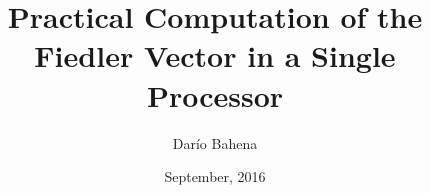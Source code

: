 \documentclass[unknownkeysallowed]{beamer}
\title{Practical Computation of the Fiedler Vector in a Single Processor}
\author{Darío Bahena}
\institute{CINVESTAV}
\date{September, 2016}
\begin{document}
	\begin{frame}[plain]
	  \titlepage
	\end{frame}
  
  
  
  
  
  
  
  
    
  
  
  
  
    
\end{document}
